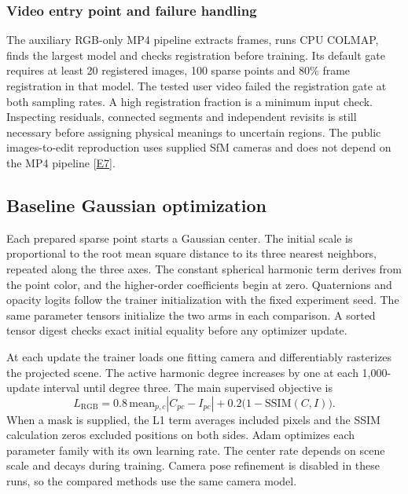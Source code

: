 \subsubsection{Video entry point and failure handling}
The auxiliary RGB-only MP4 pipeline extracts frames, runs CPU COLMAP, finds the largest model and checks registration before training. Its default gate requires at least 20 registered images, 100 sparse points and 80\% frame registration in that model. The tested user video failed the registration gate at both sampling rates. A high registration fraction is a minimum input check. Inspecting residuals, connected segments and independent revisits is still necessary before assigning physical meanings to uncertain regions. The public images-to-edit reproduction uses supplied SfM cameras and does not depend on the MP4 pipeline [\hyperlink{evE7}{E7}].

\subsection{Baseline Gaussian optimization}
Each prepared sparse point starts a Gaussian center. The initial scale is proportional to the root mean square distance to its three nearest neighbors, repeated along the three axes. The constant spherical harmonic term derives from the point color, and the higher-order coefficients begin at zero. Quaternions and opacity logits follow the trainer initialization with the fixed experiment seed. The same parameter tensors initialize the two arms in each comparison. A sorted tensor digest checks exact initial equality before any optimizer update.

At each update the trainer loads one fitting camera and differentiably rasterizes the projected scene. The active harmonic degree increases by one at each 1,000-update interval until degree three. The main supervised objective is
\begin{equation}
 L_{\mathrm{RGB}}=0.8\,\mathrm{mean}_{p,c}|C_{pc}-I_{pc}|
                         +0.2\bigl(1-\mathrm{SSIM}(C,I)\bigr).
\end{equation}
When a mask is supplied, the L1 term averages included pixels and the SSIM calculation zeros excluded positions on both sides. Adam optimizes each parameter family with its own learning rate. The center rate depends on scene scale and decays during training. Camera pose refinement is disabled in these runs, so the compared methods use the same camera model.

